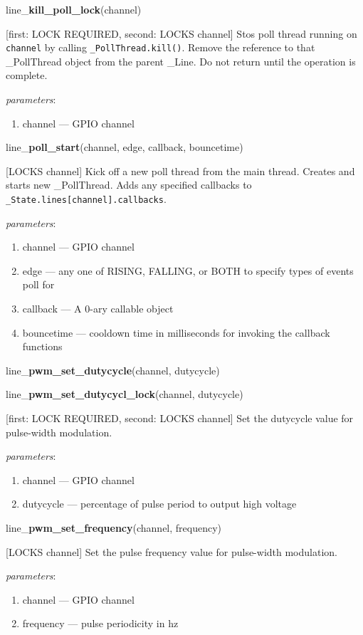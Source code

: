 \documentclass[12pt]{article}
\begin{document}
\noindent line\_\textbf{kill\_poll\_lock}(channel)

[first: LOCK REQUIRED, second: LOCKS channel]
Stos poll thread running on \texttt{channel} by calling \texttt{\_PollThread.kill()}. Remove the reference to that \_PollThread object from the parent \_Line. Do not return until the operation is complete.


\textit{parameters}:
\begin{enumerate}      
        \item channel --- GPIO channel
\end{enumerate}

\noindent line\_\textbf{poll\_start}(channel, edge, callback, bouncetime)

[LOCKS channel] Kick off a new poll thread from the main thread.
Creates and starts new \_PollThread. Adds any specified callbacks to \texttt{\_State.lines[channel].callbacks}. 

\textit{parameters}:
\begin{enumerate}      
        \item channel --- GPIO channel
        \item edge --- any one of RISING, FALLING, or BOTH to specify types of events poll for
        \item callback --- A 0-ary callable object
        \item bouncetime --- cooldown time in milliseconds for invoking the callback functions
\end{enumerate}

\noindent line\_\textbf{pwm\_set\_dutycycle}(channel, dutycycle)

\noindent line\_\textbf{pwm\_set\_dutycycl\_lock}(channel, dutycycle)

[first: LOCK REQUIRED, second: LOCKS channel]
Set the dutycycle value for pulse-width modulation.

\textit{parameters}:
\begin{enumerate}      
        \item channel --- GPIO channel
        \item dutycycle --- percentage of pulse period to output high voltage
\end{enumerate}

\noindent line\_\textbf{pwm\_set\_frequency}(channel, frequency)

[LOCKS channel] Set the pulse frequency value for pulse-width modulation.

\textit{parameters}:
\begin{enumerate}      
        \item channel --- GPIO channel
        \item frequency --- pulse periodicity in hz
\end{enumerate}
\end{document}
